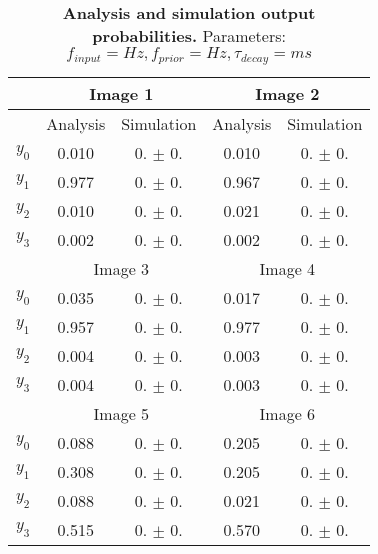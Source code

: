 \begin{table}[]
\label{tab:1D___}
\small
\tabcolsep=0.11cm
\begin{tabular}{|c|cc|cc|}
\hline
                       & \multicolumn{2}{c|}{Image 1}                       & \multicolumn{2}{c|}{Image 2}                       \\ \hline
                       & \multicolumn{1}{c|}{Analysis} & Simulation         & \multicolumn{1}{c|}{Analysis} & Simulation         \\ \hline
$y_0$                  & \multicolumn{1}{c|}{0.010}    & 0. $\pm$ 0. & \multicolumn{1}{c|}{0.010}    & 0. $\pm$ 0. \\ \hline
$y_1$                  & \multicolumn{1}{c|}{0.977}    & 0. $\pm$ 0. & \multicolumn{1}{c|}{0.967}    & 0. $\pm$ 0. \\ \hline
$y_2$                  & \multicolumn{1}{c|}{0.010}    & 0. $\pm$ 0. & \multicolumn{1}{c|}{0.021}    & 0. $\pm$ 0. \\ \hline
$y_3$                  & \multicolumn{1}{c|}{0.002}    & 0. $\pm$ 0. & \multicolumn{1}{c|}{0.002}    & 0. $\pm$ 0. \\ \hline
                       & \multicolumn{2}{c|}{Image 3}                       & \multicolumn{2}{c|}{Image 4}                       \\ \hline
$y_0$                  & \multicolumn{1}{c|}{0.035}    & 0. $\pm$ 0. & \multicolumn{1}{c|}{0.017}    & 0. $\pm$ 0. \\ \hline
$y_1$                  & \multicolumn{1}{c|}{0.957}    & 0. $\pm$ 0. & \multicolumn{1}{c|}{0.977}    & 0. $\pm$ 0. \\ \hline
$y_2$                  & \multicolumn{1}{c|}{0.004}    & 0. $\pm$ 0. & \multicolumn{1}{c|}{0.003}    & 0. $\pm$ 0. \\ \hline
$y_3$                  & \multicolumn{1}{c|}{0.004}    & 0. $\pm$ 0. & \multicolumn{1}{c|}{0.003}    & 0. $\pm$ 0. \\ \hline
						& \multicolumn{2}{c|}{Image 5}                       & \multicolumn{2}{c|}{Image 6}                       \\ \hline
$y_0$                  & \multicolumn{1}{c|}{0.088}    & 0. $\pm$ 0. & \multicolumn{1}{c|}{0.205}    & 0. $\pm$ 0. \\ \hline
$y_1$                  & \multicolumn{1}{c|}{0.308}    & 0. $\pm$ 0. & \multicolumn{1}{c|}{0.205}    & 0. $\pm$ 0. \\ \hline
$y_2$                  & \multicolumn{1}{c|}{0.088}    & 0. $\pm$ 0. & \multicolumn{1}{c|}{0.021}    & 0. $\pm$ 0. \\ \hline
$y_3$                  & \multicolumn{1}{c|}{0.515}    & 0. $\pm$ 0. & \multicolumn{1}{c|}{0.570}    & 0. $\pm$ 0. \\ \hline
\end{tabular}
\caption{\textbf{Analysis and simulation output probabilities. } Parameters: $f_{input} =  Hz, f_{prior} =  Hz, \tau_{decay} =  ms$}
\end{table}